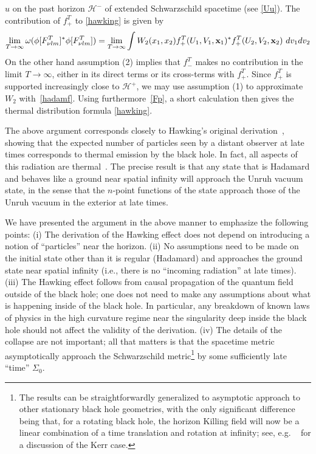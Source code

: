 \documentclass[12pt]{article}
\theoremstyle{plain}
\theoremstyle{definition}
\def\ben{\begin{equation}}
\def\een{\end{equation}}
\begin{document}
$u$ on the past horizon ${\mathcal H}^-$ of extended Schwarzschild spacetime (see \eqref{Uu}).
The contribution of $f^T_+$ to
\eqref{hawking} is given by
\ben
\lim_{T \to \infty} \omega( \phi[F_{\nu lm}^T]^* \phi[F^T_{\nu l m}] ) = \lim_{T \to \infty} \int
W_2(x_1, x_2) f^{T}_+(U_1,V_1, {\bf x}_1)^* f^{T}_+(U_2, V_2, {\bf x}_2) \ dv_1 dv_2
\een
On the other hand assumption (2) implies that $f_-^T$ makes no contribution
 in the limit $T \to \infty$, either in its direct terms or its cross-terms
with $f_+^T$.
Since $f_+^T$ is supported increasingly close to ${\mathcal H}^+$, we
may use assumption (1) to approximate $W_2$ with~\eqref{hadamf}. Using furthermore~\eqref{Fp}, 
a short calculation then gives the thermal distribution formula
\eqref{hawking}.

The above argument corresponds closely to Hawking's original derivation~\cite{hawking}, showing that the expected number of particles
seen by a distant observer at late times corresponds to thermal emission by the black hole. In fact, all aspects of
this radiation are thermal~\cite{wald}.  The precise result is that any state that is Hadamard and behaves like a ground near spatial infinity
will approach the Unruh vacuum state, in the sense that the $n$-point functions of the state approach those of
the Unruh vacuum in the exterior at late times.

We have presented the argument in the above manner to emphasize the following points: (i) The derivation of the Hawking effect does
not depend on introducing a notion of ``particles'' near the horizon. (ii) No assumptions need to be made on the initial state other than it is regular (Hadamard) and approaches the ground state near spatial infinity (i.e., there is no ``incoming radiation'' at late times). (iii) The Hawking effect follows from causal propagation of the quantum field outside of the black hole; one does not need to make any assumptions about what is happening inside of the black hole. In particular, any breakdown of known laws of physics in the high curvature regime near the singularity deep inside the black hole should not affect the validity of the derivation. (iv) The details of the collapse are not important; all that matters is that the spacetime metric asymptotically approach the Schwarzschild metric\footnote{The results can be straightforwardly generalized to asymptotic approach to other stationary black hole geometries, with the only significant difference being that, for a rotating black hole, the horizon Killing field will now be a linear combination of a time translation and rotation at infinity; see, e.g. ~\cite{hawking,wald} for a discussion of the Kerr case.} by some sufficiently late ``time'' $\Sigma_0$.
\end{document}

